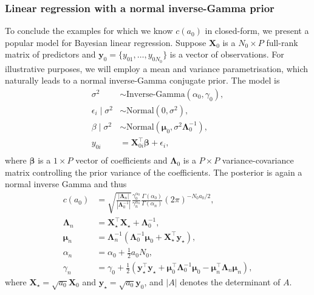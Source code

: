 \documentclass[a4paper, notitlepage, 11pt]{article}
\begin{document}
\subsubsection{Linear regression with a normal inverse-Gamma prior}
\label{sec:linreg_ex}
To conclude the examples for which we know $c(a_0)$ in closed-form, we present a popular model for Bayesian linear regression.
Suppose $\boldsymbol X_0$ is a $N_0 \times P$ full-rank matrix of predictors and $\boldsymbol y_0 = \{y_{01}, \ldots, y_{0N_0} \}$ is a vector of observations.
For illustrative purposes, we will employ a mean and variance parametrisation, which naturally leads to a normal inverse-Gamma conjugate prior.
The model is 
\begin{align*}
 \sigma^2 &\sim \text{Inverse-Gamma}(\alpha_0, \gamma_0),\\
 \epsilon_i \mid \sigma^2  &\sim \text{Normal}(0, \sigma^2), \\
 \beta \mid \sigma^2 &\sim \text{Normal}(\boldsymbol \mu_0, \sigma^2\boldsymbol\Lambda_0^{-1}),\\
 y_{0i} &= \boldsymbol X_{0i}^\top \boldsymbol\beta + \epsilon_i, \\
\end{align*} 
where $\boldsymbol\beta$ is a $ 1 \times P$ vector of coefficients and $\boldsymbol\Lambda_0$ is a $P \times P$ variance-covariance matrix controlling the prior variance of the coefficients.
The posterior is again a normal inverse Gamma and thus
\begin{align}
 \label{eq:cA0_regression}
c(a_0) &= \sqrt{\frac{|\boldsymbol\Lambda_n|}{|\boldsymbol\Lambda_0^{-1}|}} \frac{\gamma_0^{\alpha_0}}{\gamma_n^{\alpha_n}}\frac{\Gamma(\alpha_0)}{\Gamma(\alpha_n)}  (2\pi)^{-N_0 a_0/2},\\
\nonumber
\boldsymbol\Lambda_n &= \boldsymbol X_{\star}^\top\boldsymbol X_{\star} + \boldsymbol \Lambda_0^{-1}, \\
\nonumber
\boldsymbol\mu_n &= \boldsymbol\Lambda_n^{-1}\left(\boldsymbol\Lambda_0^{-1}\boldsymbol\mu_0 + \boldsymbol X_{\star}^\top\boldsymbol y_{\star} \right),  \\
\nonumber
\alpha_n &= \alpha_0 + \frac{1}{2}a_0N_0,\\
\nonumber
\gamma_n &= \gamma_0 + \frac{1}{2}\left( \boldsymbol y_{\star}^\top \boldsymbol y_{\star} + \boldsymbol \mu_0^\top \boldsymbol \Lambda_0^{-1} \boldsymbol \mu_0 - \boldsymbol\mu_n^\top \boldsymbol \Lambda_n \boldsymbol \mu_n  \right),
\end{align}
where $\boldsymbol X_{\star} = \sqrt{a_0} \boldsymbol X_0$ and $\boldsymbol y_{\star} = \sqrt{a_0} \boldsymbol y_0$, and $|A|$ denotes the determinant of $A$.
\end{document}
